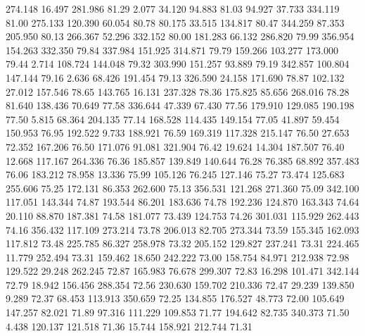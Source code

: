  274.148   16.497  281.986        81.29
   2.077   34.120   94.883        81.03
  94.927   37.733  334.119        81.00
 275.133  120.390   60.054        80.78
  80.175   33.515  134.817        80.47
 344.259   87.353  205.950        80.13
 266.367   52.296  332.152        80.00
 181.283   66.132  286.820        79.99
 356.954  154.263  332.350        79.84
 337.984  151.925  314.871        79.79
 159.266  103.277  173.000        79.44
   2.714  108.724  144.048        79.32
 303.990  151.257   93.889        79.19
 342.857  100.804  147.144        79.16
   2.636   68.426  191.454        79.13
 326.590   24.158  171.690        78.87
 102.132   27.012  157.546        78.65
 143.765   16.131  237.328        78.36
 175.825   85.656  268.016        78.28
  81.640  138.436   70.649        77.58
 336.644   47.339   67.430        77.56
 179.910  129.085  190.198        77.50
   5.815   68.364  204.135        77.14
 168.528  114.435  149.154        77.05
  41.897   59.454  150.953        76.95
 192.522    9.733  188.921        76.59
 169.319  117.328  215.147        76.50
  27.653   72.352  167.206        76.50
 171.076   91.081  321.904        76.42
  19.624   14.304  187.507        76.40
  12.668  117.167  264.336        76.36
 185.857  139.849  140.644        76.28
  76.385   68.892  357.483        76.06
 183.212   78.958   13.336        75.99
 105.126   76.245  127.146        75.27
  73.474  125.683  255.606        75.25
 172.131   86.353  262.600        75.13
 356.531  121.268  271.360        75.09
 342.100  117.051  143.344        74.87
 193.544   86.201  183.636        74.78
 192.236  124.870  163.343        74.64
  20.110   88.870  187.381        74.58
 181.077   73.439  124.753        74.26
 301.031  115.929  262.443        74.16
 356.432  117.109  273.214        73.78
 206.013   82.705  273.344        73.59
 155.345  162.093  117.812        73.48
 225.785   86.327  258.978        73.32
 205.152  129.827  237.241        73.31
 224.465   11.779  252.494        73.31
 159.462   18.650  242.222        73.00
 158.754   84.971  212.938        72.98
 129.522   29.248  262.245        72.87
 165.983   76.678  299.307        72.83
  16.298  101.471  342.144        72.79
  18.942  156.456  288.354        72.56
 230.630  159.702  210.336        72.47
  29.239  139.850    9.289        72.37
  68.453  113.913  350.659        72.25
 134.855  176.527   48.773        72.00
 105.649  147.257   82.021        71.89
  97.316  111.229  109.853        71.77
 194.642   82.735  340.373        71.50
   4.438  120.137  121.518        71.36
  15.744  158.921  212.744        71.31
